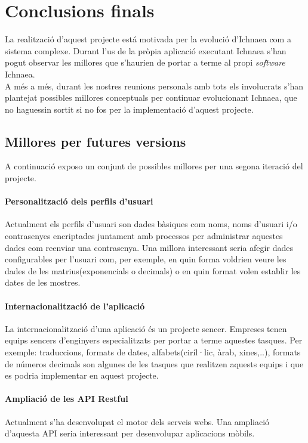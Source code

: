 \section{Conclusions finals}
La realització d'aquest projecte est\'{a} motivada per la evolució d'Ichnaea com a sistema complexe. Durant l'us de la pròpia aplicació executant Ichnaea s'han pogut observar les millores que s'haurien de portar a terme al propi \textit{software} Ichnaea.\\

A m\'{e}s a m\'{e}s, durant les nostres reunions personals amb tots els involucrats s'han plantejat possibles millores conceptuals per continuar evolucionant Ichnaea, que no haguessin sortit si no fos per la implementació d'aquest projecte. 

\subsection{Millores per futures versions}
A continuació exposo un conjunt de possibles millores per una segona iteració del projecte.

\paragraph*{Personalitzaci\'{o} dels perfils d'usuari} Actualment els perfils d'usuari son dades bàsiques com noms, noms d'usuari i/o contrasenyes encriptades juntament amb processos per administrar aquestes dades com reenviar una contrasenya. Una millora interessant seria afegir dades configurables per l'usuari com, per exemple, en quin forma voldrien veure les dades de les matrius(exponencials o decimals) o en quin format volen establir les dates de les mostres.

\paragraph*{Internacionalització de l'aplicació} La internacionalització d'una aplicació \'{e}s un projecte sencer. Empreses tenen equips sencers d'enginyers especialitzats per portar a terme aquestes tasques. Per exemple: traduccions, formats de dates, alfabets(ciríl·lic, àrab, xines,..), formats de números decimals son algunes de les tasques que realitzen aquests equips i que es podria implementar en aquest projecte. 

\paragraph*{Ampliaci\'{o} de les API Restful} Actualment s'ha desenvolupat el motor dels serveis webs. Una ampliació d'aquesta API seria interessant per desenvolupar aplicacions mòbils.

